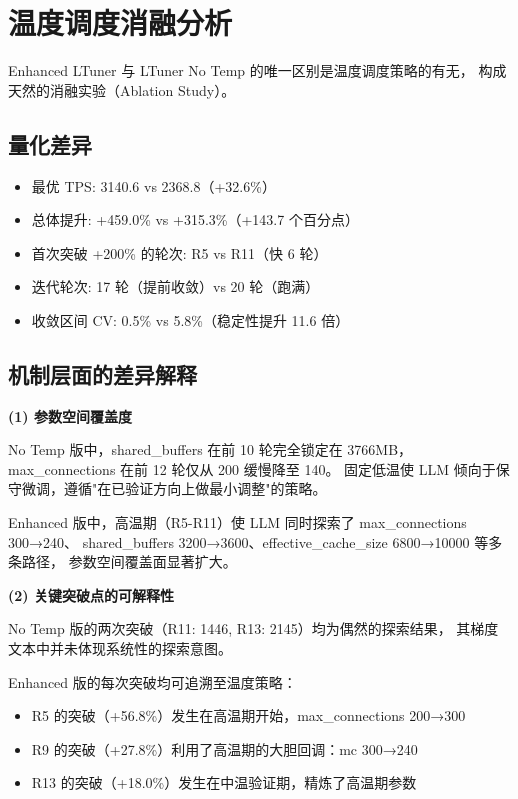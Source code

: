 
\section{温度调度消融分析}

Enhanced LTuner 与 LTuner No Temp 的唯一区别是温度调度策略的有无，
构成天然的消融实验（Ablation Study）。

\subsection{量化差异}

\begin{itemize}
  \item 最优 TPS: 3140.6 vs 2368.8（+32.6\%）
  \item 总体提升: +459.0\% vs +315.3\%（+143.7 个百分点）
  \item 首次突破 +200\% 的轮次: R5 vs R11（快 6 轮）
  \item 迭代轮次: 17 轮（提前收敛）vs 20 轮（跑满）
  \item 收敛区间 CV: 0.5\% vs 5.8\%（稳定性提升 11.6 倍）
\end{itemize}

\subsection{机制层面的差异解释}

\textbf{(1) 参数空间覆盖度}

No Temp 版中，shared\_buffers 在前 10 轮完全锁定在 3766MB，
max\_connections 在前 12 轮仅从 200 缓慢降至 140。
固定低温使 LLM 倾向于保守微调，遵循"在已验证方向上做最小调整"的策略。

Enhanced 版中，高温期（R5-R11）使 LLM 同时探索了 max\_connections 300→240、
shared\_buffers 3200→3600、effective\_cache\_size 6800→10000 等多条路径，
参数空间覆盖面显著扩大。

\textbf{(2) 关键突破点的可解释性}

No Temp 版的两次突破（R11: 1446, R13: 2145）均为偶然的探索结果，
其梯度文本中并未体现系统性的探索意图。

Enhanced 版的每次突破均可追溯至温度策略：
\begin{itemize}
  \item R5 的突破（+56.8\%）发生在高温期开始，max\_connections 200→300
  \item R9 的突破（+27.8\%）利用了高温期的大胆回调：mc 300→240
  \item R13 的突破（+18.0\%）发生在中温验证期，精炼了高温期参数
\end{itemize}

